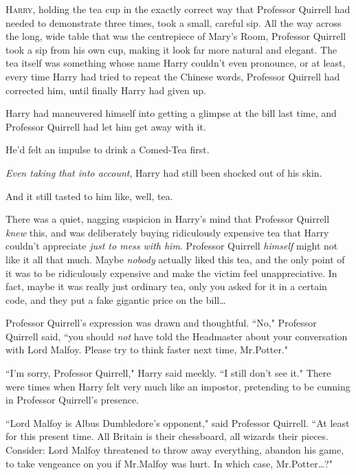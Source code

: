 
\lettrine{H}{arry,} holding the tea cup in the exactly correct way that Professor Quirrell had needed to demonstrate three times, took a small, careful sip. All the way across the long, wide table that was the centrepiece of Mary's Room, Professor Quirrell took a sip from his own cup, making it look far more natural and elegant. The tea itself was something whose name Harry couldn't even pronounce, or at least, every time Harry had tried to repeat the Chinese words, Professor Quirrell had corrected him, until finally Harry had given up.

Harry had maneuvered himself into getting a glimpse at the bill last time, and Professor Quirrell had let him get away with it.

He'd felt an impulse to drink a Comed-Tea first.

\emph{Even taking that into account}, Harry had still been shocked out of his skin.

And it still tasted to him like, well, tea.

There was a quiet, nagging suspicion in Harry's mind that Professor Quirrell \emph{knew} this, and was deliberately buying ridiculously expensive tea that Harry couldn't appreciate \emph{just to mess with him}. Professor Quirrell \emph{himself} might not like it all that much. Maybe \emph{nobody} actually liked this tea, and the only point of it was to be ridiculously expensive and make the victim feel unappreciative. In fact, maybe it was really just ordinary tea, only you asked for it in a certain code, and they put a fake gigantic price on the bill{\ldots}

Professor Quirrell's expression was drawn and thoughtful. ``No," Professor Quirrell said, ``you should \emph{not} have told the Headmaster about your conversation with Lord Malfoy. Please try to think faster next time, Mr.\?Potter."

``I'm sorry, Professor Quirrell," Harry said meekly. ``I still don't see it." There were times when Harry felt very much like an impostor, pretending to be cunning in Professor Quirrell's presence.

``Lord Malfoy is Albus Dumbledore's opponent," said Professor Quirrell. ``At least for this present time. All Britain is their chessboard, all wizards their pieces. Consider: Lord Malfoy threatened to throw away everything, abandon his game, to take vengeance on you if Mr.\?Malfoy was hurt. In which case, Mr.\?Potter{\ldots}?"

